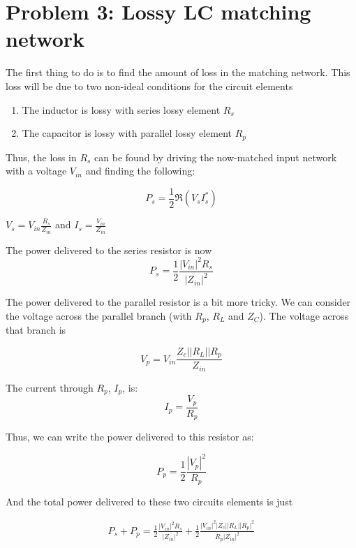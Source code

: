 \section*{Problem 3: Lossy LC matching network}

The first thing to do is to find the amount of loss in the matching network.
This loss will be due to two non-ideal conditions for the circuit elements
\begin{enumerate}
    \item The inductor is lossy with series lossy element $R_s$
    \item The capacitor is lossy with parallel lossy element $R_p$
\end{enumerate}

Thus, the loss in $R_s$ can be found by driving the now-matched input network
with a voltage $V_{in}$ and finding the following:

\[ 
        P_{s} = \frac{1}{2} \Re \left( V_{s} I_s^* \right) 
\]

$V_s = V_{in} \frac{R_s}{Z_{in}}$ and $I_s = \frac{V_{in}}{Z_{in}}$ 

The power delivered to the series resistor is now 
\[ 
    P_s = \frac{1}{2} \frac{\left|V_{in}\right|^2 R_s}{\left|Z_{in}\right|^2}
\]

The power delivered to the parallel resistor is a bit more tricky. We can
consider the voltage across the parallel branch (with $R_p$, $R_L$ and $Z_C$).
The voltage across that branch is 

\[ 
        V_p = V_{in} \frac{Z_c||R_L||R_p}{Z_{in}}
\]

The current through $R_p$, $I_p$, is:
\[ 
    I_p = \frac{V_p}{R_p} 
\]

Thus, we can write the power delivered to this resistor as:

\[ 
    P_p = \frac{1}{2}  \frac{\left|V_p \right|^2 }{R_p}
\]

And the total power delivered to these two circuits elements is just

\begin{align}
    P_s + P_p = \frac{1}{2} \frac{\left| V_{in} \right|^2 R_s}{\left| Z_{in}
    \right|^2} + \frac{1}{2} \frac{\left| V_{in} \right|^2 \Big|
Z_c||R_L||R_p \Big|^2}{R_p\left| Z_{in} \right|^2}
\end{align}


